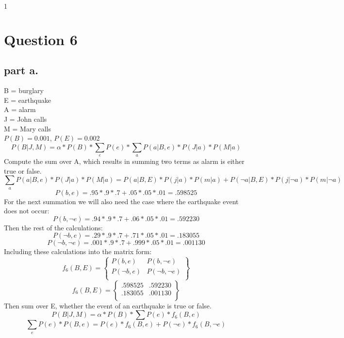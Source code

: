 1\section{Question 6}

\subsection{part a.}
B = burglary \\
E = earthquake \\
A = alarm \\
J = John calls \\ 
M = Mary calls \\
$P(B) = 0.001 $, $P(E) = 0.002$
\[P(B | J,M) = \alpha * P(B) * \sum_e{P(e) * \sum_a{P(a|B,e) * P(J|a) * P(M|a)}}
\]
Compute the sum over A, which results in summing two terms as alarm is either true or false.
\[\sum_{a}{P(a|B,e) * P(J|a) * P(M|a)} = 
P(a|B,E)*P(j|a) * P(m|a) + P(\neg a|B,E) * P(j|\neg a)*P(m|\neg a)
\]
\[P(b, e) = .95 * .9 * .7 + .05 * .05 * .01 = .598525
\]
For the next summation we will also need the case where the earthquake event does not occur:
\[P(b,\neg e) = .94 * .9 * .7 + .06 * .05 * .01 = .592230
\]
Then the rest of the calculations:
\[P(\neg b, e) = .29 * .9 * .7 + .71 * .05 * .01 = .183055
\]
\[P(\neg b,\neg e) = .001 * .9 * .7 + .999 * .05 * .01 = .001130
\]
Including these calculations into the matrix form:
\[
f_6(B,E) = \begin{Bmatrix}
P(b,e) & P(b, \neg e) \\
P(\neg b, e) & P(\neg b, \neg e) \\
\end{Bmatrix}
\]
\[
f_6(B,E) = \begin{Bmatrix}
.598525 & .592230 \\
.183055 & .001130 \\
\end{Bmatrix}
\]
Then sum over E, whether the event of an earthquake is true or false.
\[ P(B | J, M) = \alpha * P(B) * \sum{P(e) * f_6(B,e)} 
\]
\[
\sum_e{P(e) * P(B,e)} = P(e)* f_6(B,e) + P(\neg e) * f_6(B, \neg e)
\]

